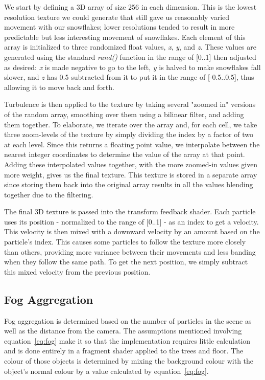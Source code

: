 \documentclass[conference]{acmsiggraph}
\begin{document}
We start by defining a 3D array of size 256 in each dimension. This is the lowest resolution texture we could generate that still gave us reasonably varied movement with our snowflakes; lower resolutions tended to result in more predictable but less interesting movement of snowflakes. Each element of this array is initialized to three randomized float values, \textit{x}, \textit{y}, and \textit{z}. These values are generated using the standard \textit{rand()} function in the range of [0..1] then adjusted as desired: \textit{x} is made negative to go to the left, \textit{y} is halved to make snowflakes fall slower, and \textit{z} has 0.5 subtracted from it to put it in the range of [-0.5..0.5], thus allowing it to move back and forth.

Turbulence is then applied to the texture by taking several "zoomed in" versions of the random array, smoothing over them using a bilinear filter, and adding them together. To elaborate, we iterate over the array and, for each cell, we take three zoom-levels of the texture by simply dividing the index by a factor of two at each level. Since this returns a floating point value, we interpolate between the nearest integer coordinates to determine the value of the array at that point. Adding these interpolated values together, with the more zoomed-in values given more weight, gives us the final texture. This texture is stored in a separate array since storing them back into the original array results in all the values blending together due to the filtering.

The final 3D texture is passed into the transform feedback shader. Each particle uses its position - normalized to the range of [0..1] -  as an index to get a velocity. This velocity is then mixed with a downward velocity by an amount based on the particle's index. This causes some particles to follow the texture more closely than others, providing more variance between their movements and less banding when they follow the same path. To get the next position, we simply subtract this mixed velocity from the previous position.

\subsection{Fog Aggregation}
Fog aggregation is determined based on the number of particles in the scene as well as the distance from the camera. The assumptions mentioned involving equation~\ref{eq:fog} make it so that the implementation requires little calculation and is done entirely in a fragment shader applied to the trees and floor. The colour of those objects is determined by mixing the background colour with the object's normal colour by a value calculated by equation~\ref{eq:fog}.
\end{document}
